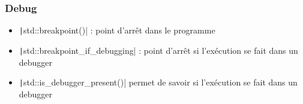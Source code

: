 \documentclass[C++.tex]{subfiles}
\begin{document}
\begin{frame}[fragile]
	\frametitle{Debug}
	\begin{itemize}
		\item \texttt|std::breakpoint()| : point d'arrêt dans le programme
		\item \texttt|std::breakpoint_if_debugging| : point d'arrêt si l'exécution se fait dans un debugger
		\item \texttt|std::is_debugger_present()| permet de savoir si l'exécution se fait dans un debugger
	\end{itemize}

\end{frame}
\end{document}
